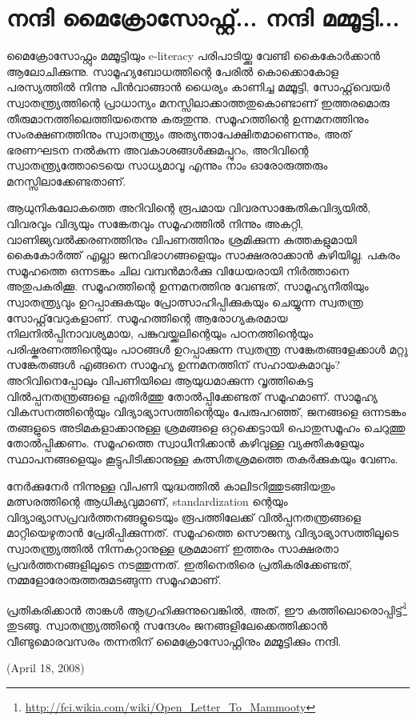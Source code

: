 \section*{നന്ദി മൈക്രോസോഫ്റ്റ്... നന്ദി മമ്മൂട്ടി...}
\vskip 2pt

മൈക്രോസോഫ്റ്റും മമ്മൂട്ടിയും e-literacy പരിപാടിയ്ക്കു വേണ്ടി കൈകോര്‍ക്കാന്‍ ആലോചിക്കുന്നു. 
സാമൂഹ്യബോധത്തിന്റെ പേരില്‍ കൊക്കൊകോള പരസ്യത്തില്‍ നിന്നു പിന്‍വാങ്ങാന്‍ ധൈര്യം കാണിച്ച മമ്മൂട്ടി, 
സോഫ്റ്റ്‌വെയര്‍ സ്വാതന്ത്ര്യത്തിന്റെ പ്രാധാന്യം മനസ്സിലാക്കാത്തതുകൊണ്ടാണ് ഇത്തരമൊരു തീരുമാനത്തിലെത്തിയതെന്നു 
കരുതുന്നു. സമൂഹത്തിന്റെ ഉന്നമനത്തിനും സംരക്ഷണത്തിനും സ്വാതന്ത്ര്യം അത്യന്താപേക്ഷിതമാണെന്നും, അത് ഭരണഘടന 
നല്‍കുന്ന അവകാശങ്ങള്‍ക്കുമപ്പുറം, അറിവിന്റെ സ്വാതന്ത്ര്യത്തോടെയെ സാധ്യമാവൂ എന്നും നാം ഓരോരുത്തരും 
മനസ്സിലാക്കേണ്ടതാണ്.

ആധുനികലോകത്തെ അറിവിന്റെ രൂപമായ വിവരസാങ്കേതികവിദ്യയില്‍, വിവരവും വിദ്യയും സങ്കേതവും സമൂഹത്തില്‍ 
നിന്നും അകറ്റി, വാണിജ്യവല്‍ക്കരണത്തിനും വിപണത്തിനും ശ്രമിക്കുന്ന കുത്തകളുമായി കൈകോര്‍ത്ത് എല്ലാ ജനവിഭാഗങ്ങളെയും 
സാക്ഷരരാക്കാന്‍ കഴിയില്ല. പകരം സമൂഹത്തെ ഒന്നടങ്കം ചില വമ്പന്‍മാര്‍ക്കു വിധേയരായി നിര്‍ത്താനെ അതുപകരിക്കൂ. 
സമൂഹത്തിന്റെ ഉന്നമനത്തിനു വേണ്ടത്, സാമൂഹ്യനീതിയും സ്വാതന്ത്ര്യവും ഉറപ്പാക്കുകയും പ്രോത്സാഹിപ്പിക്കുകയും 
ചെയ്യുന്ന സ്വതന്ത്ര സോഫ്റ്റ്‌വേറുകളാണ്. സമൂഹത്തിന്റെ ആരോഗ്യകരമായ നിലനില്‍പ്പിനാവശ്യമായ, പങ്കുവയ്ക്കലിന്റെയും 
പഠനത്തിന്റെയും പരിഷ്കരണത്തിന്റെയും പാഠങ്ങള്‍ ഉറപ്പാക്കുന്ന സ്വതന്ത്ര സങ്കേതങ്ങളേക്കാള്‍ മറ്റു സങ്കേതങ്ങള്‍ എങ്ങനെ 
സാമൂഹ്യ ഉന്നമനത്തിന് സഹായകമാവും? അറിവിനെപ്പോലും വിപണിയിലെ ആയുധമാക്കുന്ന വൃത്തികെട്ട വില്‍പ്പനതന്ത്രങ്ങളെ 
എതിര്‍ത്തു തോല്‍പ്പിക്കേണ്ടത് സമൂഹമാണ്. സാമൂഹ്യ വികസനത്തിന്റെയും വിദ്യാഭ്യാസത്തിന്റെയും പേരുപറഞ്ഞ്, 
ജനങ്ങളെ ഒന്നടങ്കം തങ്ങളുടെ അടിമകളാക്കാനുള്ള ശ്രമങ്ങളെ ഒറ്റക്കെട്ടായി പൊതുസമൂഹം ചെറുത്തു തോല്‍പ്പിക്കണം. 
സമൂഹത്തെ സ്വാധീനിക്കാന്‍ കഴിവുള്ള വ്യക്തികളേയും സ്ഥാപനങ്ങളെയും കൂട്ടുപിടിക്കാനുള്ള കുത്സിതശ്രമത്തെ 
തകര്‍ക്കുകയും വേണം.

നേര്‍ക്കുനേര്‍ നിന്നുള്ള വിപണി യുദ്ധത്തില്‍ കാലിടറിത്തുടങ്ങിയതും മത്സരത്തിന്റെ ആധിക്യവുമാണ്, standardization ന്റെയും 
വിദ്യാഭ്യാസപ്രവര്‍ത്തനങ്ങളുടെയും രൂപത്തിലേക്ക് വില്‍പ്പനതന്ത്രങ്ങളെ മാറ്റിയെഴുതാന്‍ പ്രേരിപ്പിക്കുന്നത്. 
സമൂഹത്തെ സൌജന്യ വിദ്യാഭ്യാസത്തിലൂടെ സ്വാതന്ത്ര്യത്തില്‍ നിന്നകറ്റാനുള്ള ശ്രമമാണ് ഇത്തരം സാക്ഷരതാ 
പ്രവര്‍ത്തനങ്ങളിലൂടെ നടത്തുന്നത്. ഇതിനെതിരെ പ്രതികരിക്കേണ്ടത്, നമ്മളോരോരുത്തരുമടങ്ങുന്ന സമൂഹമാണ്.

പ്രതികരിക്കാന്‍ താങ്കള്‍ ആഗ്രഹിക്കുന്നുവെങ്കില്‍, അത്, 
ഈ കത്തിലൊരൊപ്പിട്ട്\footnote{\url{http://fci.wikia.com/wiki/Open_Letter_To_Mammooty}} തുടങ്ങൂ. 
സ്വാതന്ത്ര്യത്തിന്റെ സന്ദേശം ജനങ്ങളിലേക്കെത്തിക്കാന്‍ വീണ്ടുമൊരവസരം തന്നതിന് മൈക്രോസോഫ്റ്റിനും മമ്മൂട്ടിക്കും നന്ദി.

(April 18, 2008)
\newpage
